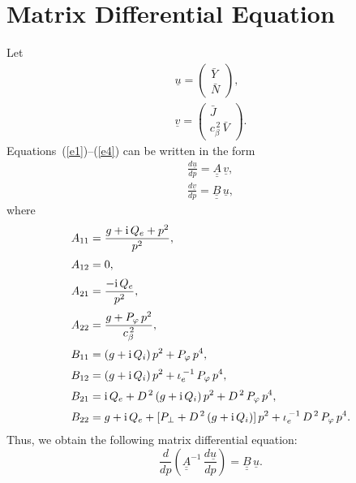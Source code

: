 \documentclass[12pt,prb,aps,notitlepage]{revtex4-1}
\begin{document}
\section{Matrix Differential Equation}
Let
\begin{align}
\underline{u}= \left(\begin{array}{c}\bar{Y}\\\bar{N}\end{array}\right),\\[0.5ex]
\underline{v}= \left(\begin{array}{c}\bar{J}\\c_\beta^{\,2}\,\bar{V}\end{array}\right).
\end{align}
Equations~(\ref{e1})--(\ref{e4}) can be written in the form 
\begin{align}
\frac{d\underline{u}}{dp}= \underline{\underline{A}}\,\underline{v},\\[0.5ex]
\frac{d\underline{v}}{dp}= \underline{\underline{B}}\,\underline{u},
\end{align}
where
\begin{align}
A_{11} &=  \frac{g+{\rm i}\,Q_e+p^2}{p^2},\\[0.5ex]
A_{12}&=0,\\[0.5ex]
A_{21} &= \frac{-{\rm i}\,Q_e}{p^2},\\[0.5ex]
A_{22} &= \frac{g + P_\varphi\,p^2}{c_\beta^{\,2}},\\[0.5ex]
B_{11} &= (g+{\rm i}\,Q_i)\,p^2 + P_\varphi\,p^4,\\[0.5ex]
B_{12} &= (g+{\rm i}\,Q_i)\,p^2 + \iota_e^{\,-1}\,P_\varphi\,p^4,\\[0.5ex]
B_{21}&= {\rm i}\,Q_e+ D^{\,2}\,(g+{\rm i}\,Q_i)\,p^2 + D^{\,2}\,P_\varphi\,p^4,\\[0.5ex]
B_{22} & =g+{\rm i}\,Q_e + [P_\perp + D^{\,2}\,(g + {\rm i}\,Q_i)]\,p^2 + \iota_e^{\,-1}\,D^{\,2}\,P_\varphi\,p^4.
\end{align}
Thus, we obtain the following matrix differential equation: 
\begin{equation}\label{mat}
\frac{d}{dp}\!\left(\underline{\underline{A}}^{-1}\,\frac{d\underline{u}}{dp}\right) = \underline{\underline{B}}\,\underline{u}.
\end{equation}
\end{document}
